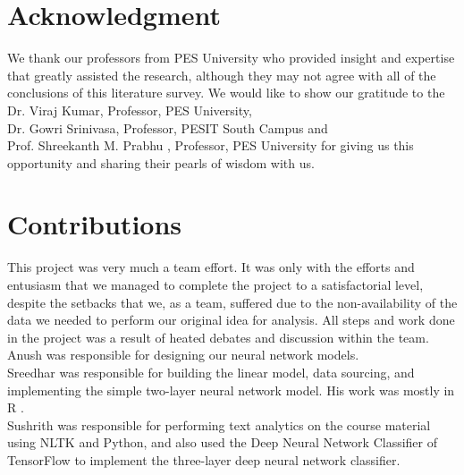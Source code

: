 \documentclass[conference]{IEEEtran}
\begin{document}
	\section*{Acknowledgment}
We thank our professors from PES University who provided insight and expertise that greatly assisted the research, although they may not agree with all of the conclusions of this literature survey. We would like to show our gratitude to the Dr. Viraj Kumar, Professor, PES University,\\  Dr. Gowri Srinivasa, Professor, PESIT South Campus and \\ Prof. Shreekanth M. Prabhu , Professor, PES University for giving us this opportunity and sharing their pearls of wisdom with us.

	\section*{Contributions}
This project was very much a team effort. It was only with the efforts and entusiasm that we managed to complete the project to a satisfactorial level, despite the setbacks that we, as a team, suffered due to the non-availability of the data we needed to perform our original idea for analysis. All steps and work done in the project was a result of heated debates and discussion within the team.\\
Anush was responsible for designing our neural network models.\\
Sreedhar was responsible for building the linear model, data sourcing, and implementing the simple two-layer neural network model. His work was mostly in R \cite{r}.\\
Sushrith was responsible for performing text analytics on the course material using NLTK \cite{Loper02nltk:the} and Python, and also used the Deep Neural Network Classifier of TensorFlow \cite{tensorflow2015-whitepaper} to implement the three-layer deep neural network classifier.



\end{document}
